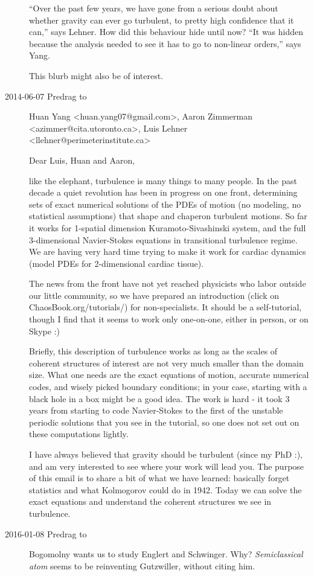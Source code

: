 \begin{description}
``Over the past few years, we have gone from a serious doubt about
whether gravity can ever go turbulent, to pretty high confidence that it
can,'' says Lehner.
How did this behaviour hide until now? ``It was hidden because the
analysis needed to see it has to go to non-linear orders,'' says Yang.

This
{blurb} might also be of interest.

\item[2014-06-07 Predrag to]
Huan Yang <huan.yang07@gmail.com>,
Aaron Zimmerman <azimmer@cita.utoronto.ca>,
Luis Lehner <llehner@perimeterinstitute.ca>

Dear Luis, Huan and Aaron,

like the elephant, turbulence is many things to many people. In the past
decade a quiet revolution has been in progress on one front, determining
sets of exact numerical solutions of the PDEs of motion (no modeling, no
statistical assumptions) that shape and chaperon turbulent motions. So
far it works for 1-spatial dimension Kuramoto-Sivashinski system, and the
full 3-dimensional Navier-Stokes equations in transitional turbulence
regime. We are having very hard time trying to make it work for cardiac
dynamics (model PDEs for 2-dimensional cardiac tissue).

The news from the front have not yet reached physicists who labor outside
our little community, so we have prepared an introduction (click on
ChaosBook.org/tutorials/) for non-specialists. It should be a
self-tutorial, though I find that it seems to work only one-on-one,
either in person, or on Skype :)

Briefly, this description of turbulence works as long as the scales of
coherent structures of interest are not very much smaller than the domain
size. What one needs are the exact equations of motion, accurate
numerical codes, and wisely picked boundary conditions; in your case,
starting with a black hole in a box might be a good idea. The work is
hard - it took 3 years from starting to code Navier-Stokes to the first
of the unstable periodic solutions that you see in the tutorial, so one
does not set out on these computations lightly.

I have always believed that gravity should be turbulent (since my PhD :),
and am very interested to see where your work will lead you. The purpose
of this email is to share a bit of what we have learned: basically forget
statistics and what Kolmogorov could do in 1942. Today we can solve the
exact equations and understand the coherent structures we see in
turbulence.

\item[2016-01-08 Predrag to]
Bogomolny wants us to study Englert and
Schwinger. Why?
 {\em Semiclassical atom} seems to be reinventing
Gutzwiller, without citing him.

\end{description}
